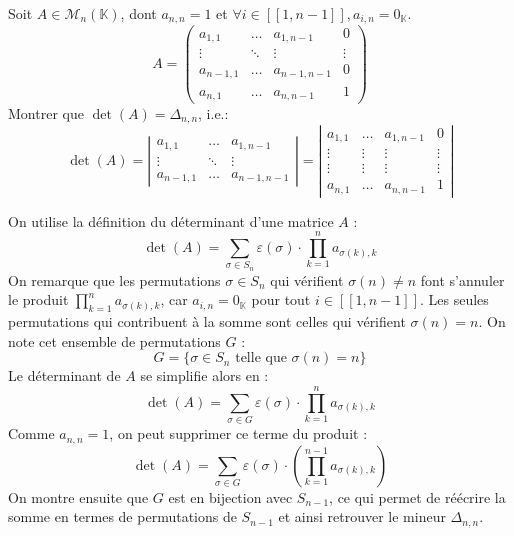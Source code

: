 \documentclass[11pt, a4paper]{article}
\theoremstyle{definition}
\begin{document}
\clearpage

\begin{tcolorbox}[instructionstyle]
	Soit $A \in \mathcal M_n(\mathbb{K})$, dont $a_{n,n} = 1$ et $\forall i \in [\![1,n-1]\!], a_{i,n} = 0_\mathbb{K}$.
    $$A = \left(\begin{matrix} a_{1,1} & \dots & a_{1,n-1} & 0 \\ \vdots & \ddots & \vdots & \vdots \\ a_{n-1,1} & \dots & a_{n-1,n-1} & 0 \\ a_{n,1} & \dots & a_{n,n-1} & 1 \end{matrix}\right)$$
    Montrer que $\det(A) = \Delta_{n,n}$, i.e.:
    $$\det(A) = \left|\begin{matrix} a_{1,1} & \dots & a_{1,n-1} \\ \vdots & \ddots & \vdots \\ a_{n-1,1} & \dots & a_{n-1,n-1} \end{matrix}\right| = \left|\begin{matrix} a_{1,1} & \dots & a_{1,n-1} & 0 \\ \vdots & \vdots & \vdots & \vdots \\ \vdots & \vdots & \vdots & \vdots \\ a_{n,1} & \dots & a_{n,n-1} & 1 \end{matrix}\right|$$
\end{tcolorbox}

\begin{tcolorbox}[methodstyle]
	On utilise la définition du déterminant d'une matrice $A$ :
	$$\det(A) = \sum_{\sigma \in S_n} \varepsilon(\sigma) \cdot \prod_{k=1}^{n} a_{\sigma(k), k}$$
	On remarque que les permutations $\sigma \in S_n$ qui vérifient $\sigma(n) \ne n$ font s'annuler le produit $\prod_{k=1}^{n} a_{\sigma(k), k}$, car $a_{i,n} = 0_\mathbb{K}$ pour tout $i \in [\![1,n-1]\!]$. Les seules permutations qui contribuent à la somme sont celles qui vérifient $\sigma(n) = n$. On note cet ensemble de permutations $G$ :
	$$G = \{\sigma \in S_n \text{ telle que } \sigma(n) = n\}$$
	Le déterminant de $A$ se simplifie alors en :
	$$\det(A) = \sum_{\sigma \in G} \varepsilon(\sigma) \cdot \prod_{k=1}^{n} a_{\sigma(k), k}$$
	Comme $a_{n,n} = 1$, on peut supprimer ce terme du produit :
	$$\det(A) = \sum_{\sigma \in G} \varepsilon(\sigma) \cdot \left(\prod_{k=1}^{n-1} a_{\sigma(k), k}\right)$$
	On montre ensuite que $G$ est en bijection avec $S_{n-1}$, ce qui permet de réécrire la somme en termes de permutations de $S_{n-1}$ et ainsi retrouver le mineur $\Delta_{n,n}$.
\end{tcolorbox}
\end{document}
